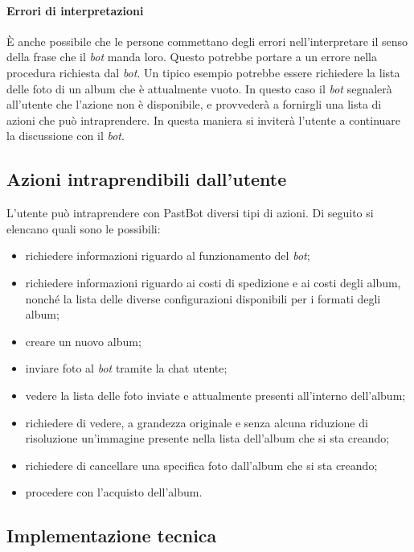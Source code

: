 \paragraph*{Errori di interpretazioni} È anche possibile che le persone
commettano degli errori nell'interpretare il senso della frase che il
\textit{bot} manda
loro. Questo potrebbe portare a un errore nella procedura richiesta dal
\textit{bot}. Un
tipico esempio potrebbe essere richiedere la lista delle foto di un album che è
attualmente vuoto. In questo caso il \textit{bot} segnalerà all'utente che
l'azione non
è disponibile, e provvederà a fornirgli una lista di azioni che può
intraprendere. In questa maniera si inviterà l'utente a continuare la
discussione con il \textit{bot}.

\subsection{Azioni intraprendibili dall'utente}

L'utente può intraprendere con PastBot diversi tipi di azioni. Di seguito si
elencano quali sono le possibili:

\begin{itemize}

  \item richiedere informazioni riguardo al funzionamento del \textit{bot};
  \item richiedere informazioni riguardo ai costi di spedizione e ai costi
degli album, nonché la lista delle diverse configurazioni disponibili per i
formati degli album;
  \item creare un nuovo album;
  \item inviare foto al \textit{bot} tramite la chat utente;
  \item vedere la lista delle foto inviate e attualmente presenti all'interno
dell'album;
  \item richiedere di vedere, a grandezza originale e senza alcuna riduzione di
risoluzione un'immagine presente nella lista dell'album che si sta creando;
  \item richiedere di cancellare una specifica foto dall'album che si sta
creando;
  \item procedere con l'acquisto dell'album.
\end{itemize}

\subsection{Implementazione tecnica}

